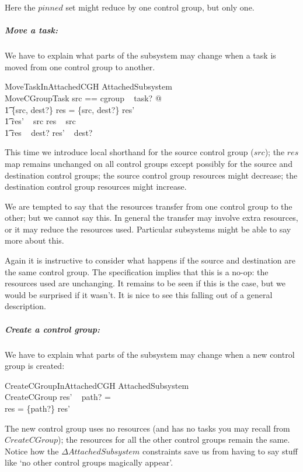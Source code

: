 \documentclass[a4paper,twoside,12pt]{article}
\begin{document}
Here the $pinned$ set might reduce by one control group, but only one.

\subparagraph{Move a task:}
We have to explain what parts of the subsystem may change when a task is moved from one control group to another.

\begin{schema}{MoveTaskInAttachedCGH}
\Delta AttachedSubsystem \\
MoveCGroupTask
\where
\LET src == cgroup ~ task? @ \\
\t1 \{src, dest?\} \ndres res = \{src, dest?\} \ndres res' \land \\
\t1 res' ~ src \subseteq res ~ src \land \\
\t1 res ~ dest? \subseteq res' ~ dest?
\end{schema}
This time we introduce local shorthand for the source control group ($src$); 
the $res$ map remains unchanged on all control groups except possibly for the source and destination control groups;
the source control group resources might decrease;
the destination control group resources might increase.

We are tempted to say that the resources transfer from one control group to the other; but we cannot say this. 
In general the transfer may involve extra resources, or it may reduce the resources used. Particular
subsystems might be able to say more about this.

Again it is instructive to consider what happens if the source and destination are the same control group. The specification implies that this is a no-op: the resources used are unchanging. It remains to be seen if this is the case,
but we would be surprised if it wasn't.  It is nice to see this falling out of a general description.

\subparagraph{Create a control group:}
We have to explain what parts of the subsystem may change when a new control group is created:

\begin{schema}{CreateCGroupInAttachedCGH}
\Delta AttachedSubsystem \\
CreateCGroup
\where
res' ~ path? = \emptyset \\
res = \{path?\} \ndres res' 
\end{schema}
The new control group uses no resources (and has no tasks you may recall from $CreateCGroup$); the resources
for all the other control groups remain the same. Notice how the $\Delta AttachedSubsystem$ constraints save us
from having to say stuff like `no other control groups magically appear'.
\end{document}
